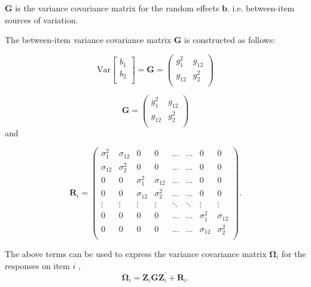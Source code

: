 \documentclass[12pt, a4paper]{report}
\theoremstyle{plain}
\theoremstyle{definition}
\theoremstyle{remark}
\begin{document}

$\boldsymbol{G}$ is the variance covariance matrix for the random effects $\boldsymbol{b}$.
i.e. between-item sources of variation. 

The between-item variance covariance matrix $\boldsymbol{G}$ is constructed as follows:

\[ \mbox{Var}  \left[
\begin{array}{c}
b_1   \\
b_2  \\
\end{array}
\right] =  \boldsymbol{G} =\left(
\begin{array}{cc}
g^2_1  & g_{12} \\
g_{12} & g^2_2 \\
\end{array}
\right) \]

\[ \boldsymbol{G} =\left(
\begin{array}{cc}
g^2_1  & g_{12} \\
g_{12} & g^2_2 \\
\end{array}
\right) \]
and


\[ \boldsymbol{R}_i =\left(
\begin{array}{cccccccc}
\sigma^2_1  & \sigma_{12} & 0 & 0 & \ldots & \ldots & 0 & 0 \\
\sigma_{12} & \sigma^2_2  & 0 & 0  & \ldots & \ldots & 0 & 0\\

0 & 0 &\sigma^2_1  & \sigma_{12} & \ldots & \ldots& 0 &  0 \\
0 & 0 &\sigma_{12} & \sigma^2_2  & \ldots & \ldots & 0 & 0 \\
\vdots & \vdots &\vdots & \vdots & \ddots & \ddots& \vdots & \vdots \\

0 & 0 &0 & 0 & \ldots & \ldots&\sigma^2_1  & \sigma_{12} \\
0 & 0 &0 & 0 & \ldots & \ldots &\sigma_{12} & \sigma^2_2 \\
\end{array}
\right). \]



\bigskip
The above terms can be used to express the  variance covariance matrix $\boldsymbol{\Omega}_i$ for the responses on item $i$ ,
\[
\boldsymbol{\Omega}_i = \boldsymbol{Z}_i \boldsymbol{G} \boldsymbol{Z}_i^{\prime} + \boldsymbol{R}_i.
\]
\end{document}

